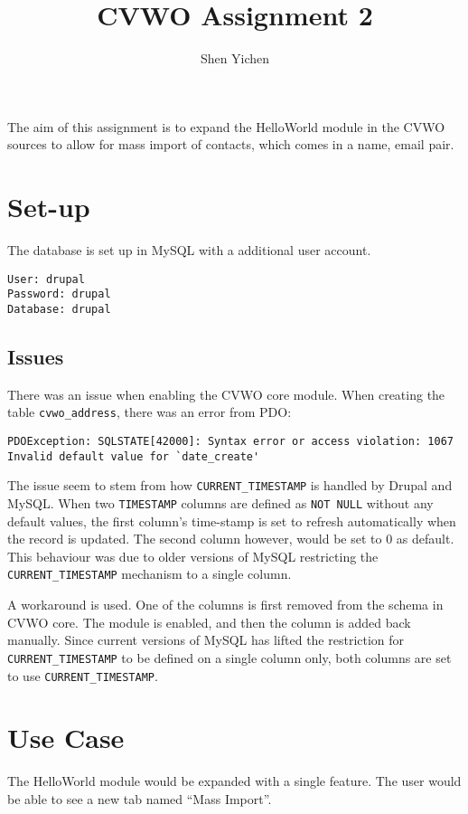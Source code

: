 \documentclass[12pt]{article}
\title{\textbf{\textsf{CVWO Assignment 2}}}
\date{}
\author{\textsf{Shen Yichen}}
\begin{document}
\maketitle

The aim of this assignment is to expand the HelloWorld module in the CVWO sources to allow for mass import of contacts, which comes in a {name, email} pair.

\section*{Set-up}

The database is set up in MySQL with a additional user account.

\begin{lstlisting}
User: drupal
Password: drupal
Database: drupal
\end{lstlisting}

\subsection*{Issues}

There was an issue when enabling the CVWO core module. When creating the table \texttt{cvwo\_address}, there was an error from PDO:\@

\begin{lstlisting}
PDOException: SQLSTATE[42000]: Syntax error or access violation: 1067 Invalid default value for `date_create'
\end{lstlisting}

The issue seem to stem from how \texttt{CURRENT\_TIMESTAMP} is handled by Drupal and MySQL\@. When two \texttt{TIMESTAMP} columns are defined as \texttt{NOT NULL} without any default values, the first column's time-stamp is set to refresh automatically when the record is updated. The second column however, would be set to 0 as default. This behaviour was due to older versions of MySQL restricting the \texttt{CURRENT\_TIMESTAMP} mechanism to a single column.

A workaround is used. One of the columns is first removed from the schema in CVWO core. The module is enabled, and then the column is added back manually. Since current versions of MySQL has lifted the restriction for \texttt{CURRENT\_TIMESTAMP} to be defined on a single column only, both columns are set to use \texttt{CURRENT\_TIMESTAMP}.

\section*{Use Case}

The HelloWorld module would be expanded with a single feature. The user would be able to see a new tab named ``Mass Import''.
\end{document}
